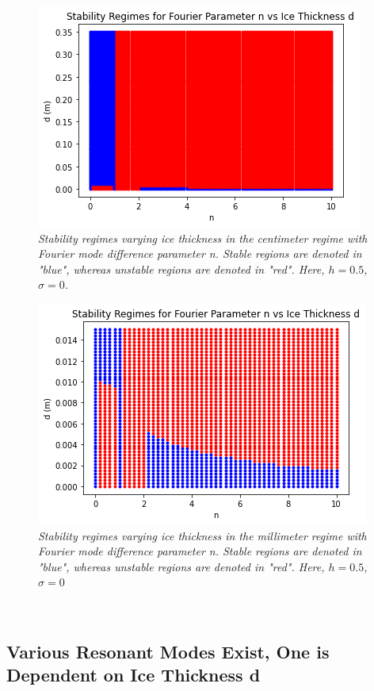 \documentclass{article}
\begin{document}
\begin{figure}[hbt!]
\centering
\includegraphics[scale = .8]{Stability CM .png}
\caption{ \emph{Stability regimes varying ice thickness in the centimeter regime with Fourier mode difference parameter n. Stable regions are denoted in "blue", whereas unstable regions are denoted in "red". Here, \(h = 0.5\), \(\sigma = 0\). }} \label{CM}
\end{figure}


\begin{figure}[hbt!]
\centering
\includegraphics[scale = .8]{Stability MM.png}
\caption{\emph{Stability regimes varying ice thickness in the millimeter regime with Fourier mode difference parameter n. Stable regions are denoted in "blue", whereas unstable regions are denoted in "red". Here, \(h = 0.5\), \(\sigma = 0\)}} \label{MM}
\end{figure}

\\

\clearpage

\subsection{Various Resonant Modes Exist, One is Dependent on Ice Thickness d}
\end{document}
